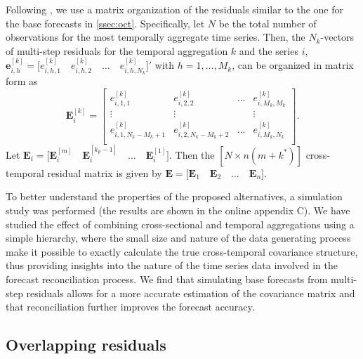 \documentclass[review, 11pt]{elsarticle}
\newcommand{\evet}{\bm{e}}
\newcommand{\Evet}{\bm{E}}
\theoremstyle{definition}
\begin{document}
Following \cite{difonzo2023}, we use a matrix organization of the residuals similar to the one for the base forecasts in \autoref{ssec:oct}. Specifically, let $N$ be the total number of observations for the most temporally aggregate time series. Then, the $N_k$-vectors of multi-step residuals for the temporal aggregation $k$ and the series $i$, $\evet_{i,h}^{[k]} =  \Big[e_{i,h,1}^{[k]} \quad e_{i,h,2}^{[k]} \quad \dots \quad e_{i,h,N_k}^{[k]}\Big]'$ with $h = 1,\dots, M_k$, can be organized in matrix form as
$$
	\Evet_i^{[k]} = \begin{bmatrix}
		e_{i,1,1}^{[k]}                     & e_{i,2,2}^{[k]}                     & \dots & e_{i,M_k,M_k}^{[k]} \\[-0.25cm]
		\vdots                            & \vdots                            &       & \vdots                  \\[-0.25cm]
		e_{i,1,N_k - M_k + 1}^{[k]} & e_{i,2,N_k - M_k + 2}^{[k]} & \dots & e_{i,M_k,N_k}^{[k]}         \\
	\end{bmatrix}.
$$
Let $\Evet_i = \Big[\Evet_i^{[m]} \quad \Evet_i^{[k_p-1]} \quad \dots \quad \Evet_i^{[1]}  \Big]$. Then the $[N \times n(m+k^\ast)]$ cross-temporal residual matrix is given by $
	\Evet = \Big[\Evet_1 \quad \Evet_2 \quad \dots \quad \Evet_n \Big]$.

To better understand the properties of the proposed alternatives, a simulation study was performed (the results are shown in the online appendix C). We have studied the effect of combining cross-sectional and temporal aggregations using a simple hierarchy, where the small size and nature of the data generating process make it possible to exactly calculate the true cross-temporal covariance structure, thus providing insights into the nature of the time series data involved in the forecast reconciliation process. We find that simulating base forecasts from multi-step residuals allows for a more accurate estimation of the covariance matrix and that reconciliation further improves the forecast accuracy. %

\subsection{Overlapping residuals}\label{ssec:over_res}
\end{document}
